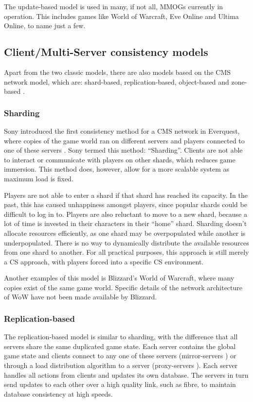\documentclass[10pt,a4paper,journal,cspaper,compsoc]{IEEEtran}
\begin{document}
The update-based model is used in many, if not all, MMOGs currently in operation. This includes games like World of Warcraft, Eve Online and Ultima
Online, to name just a few.

\subsection{Client/Multi-Server consistency models}
\label{cms_models}


Apart from the two classic models, there are also models based on the \ac{CMS} network model, which are: shard-based, replication-based, object-based
and zone-based \cite{Hu_voronoi_IM}.

\subsubsection{Sharding}
Sony introduced the first consistency method for a \ac{CMS} network in Everquest, where copies of the game world ran on different servers and players
connected to one of these servers \cite{engineering_everquest}. Sony termed this method: ``Sharding''. Clients are not able to interact or
communicate with players on other shards, which reduces game immersion. This method does, however, allow for a more scalable system as maximum load
is fixed.

Players are not able to enter a shard if that shard has reached its capacity. In the past, this has caused unhappiness amongst players, since popular
shards could be difficult to log in to. Players are also reluctant to move to a new shard, because a lot of time is invested in their characters in
their ``home'' shard. Sharding doesn't allocate resources efficiently, as one shard may be overpopulated while another is underpopulated. There is no
way to dynamically distribute the available resources from one shard to another. For all practical purposes, this approach is still merely a \ac{CS}
approach, with players forced into a specific \ac{CS} environment.

Another examples of this model is Blizzard's World of Warcraft, where many copies exist of the same game world. Specific details of the network
architecture of WoW have not been made available by Blizzard.

\subsubsection{Replication-based}
The replication-based model is similar to sharding, with the difference that all servers share the same duplicated game state. Each server contains
the global game state and clients connect to any one of these servers (mirror-servers \cite{mirrored_server}) or through a load distribution
algorithm to a server (proxy-servers \cite{proxy_server_dist}). Each server handles all actions from clients and updates its own database. The
servers in turn send updates to each other over a high quality link, such as fibre, to maintain database consistency at high speeds.
\end{document}
